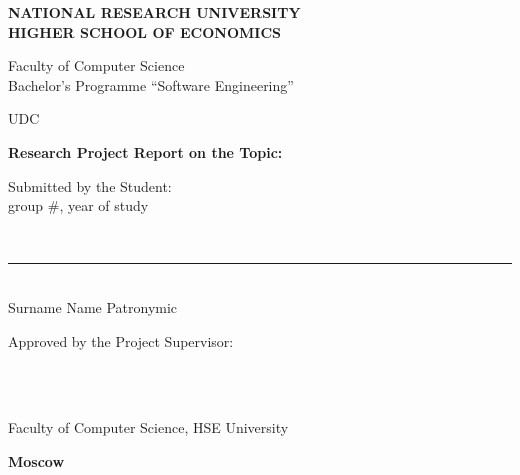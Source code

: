 \begin{titlepage}
\thispagestyle{empty}
\singlespacing
\footnotesize
\setlength{\parindent}{0pt}
\setlength{\parskip}{0pt}


\begin{center}
\textbf{NATIONAL RESEARCH UNIVERSITY}\\
\textbf{HIGHER SCHOOL OF ECONOMICS}

\vspace{0.35cm}
Faculty of Computer Science\\
Bachelor's Programme ``Software Engineering''
\end{center}

\vspace{0.3cm}
\noindent
UDC~\hseUDC

\vspace{1.2cm}
\begin{center}
\textbf{\normalsize Research Project Report on the Topic:}

\vspace{0.45cm}
\underline{\makebox[0.9\textwidth][c]{\hseProjectName}}
\end{center}

\vspace{1.4cm}
\noindent
\begin{minipage}[t]{0.5\textwidth}
\raggedright
Submitted by the Student:\\
group \#\hseGroup, \hseCourse{} year of study

\vspace{0.35cm}
\strut\hseAuthorName\\[-0.05cm]
\rule{6cm}{0.4pt}\\[-0.05cm]
{\scriptsize Surname Name Patronymic}
\end{minipage}

\vspace{0.9cm}
\noindent
\begin{minipage}[t]{0.7\textwidth}
\raggedright
Approved by the Project Supervisor:\\
\strut\hseSupervisorName\\
\strut\hseSupervisorTitle\\
Faculty of Computer Science, HSE University
\end{minipage}

\vfill
\begin{center}
\textbf{Moscow \hseYear}
\end{center}

\end{titlepage}

\setcounter{page}{2}
\clearpage
